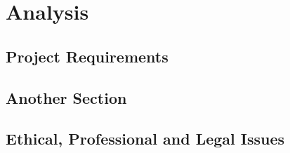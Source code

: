 \chapter{Analysis}



\section{Project Requirements}



\section{Another Section}



\section{Ethical, Professional and Legal Issues}


